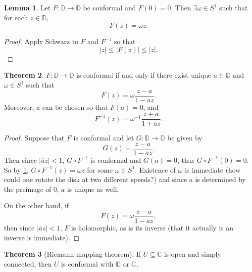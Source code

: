 \documentclass[12pt]{report}
\newcommand{\CC}{\mathbb{C}}
\newcommand{\DD}{\mathbb{D}}
\theoremstyle{definition}
\newtheorem{theorem}{Theorem}[chapter]
\newtheorem{lemma}[theorem]{Lemma}
\begin{document}
\begin{lemma}
\label{rotation of the disk}
Let $F: \DD \to \DD$ be conformal and $F(0) = 0$. Then $\exists \omega \in S^1$ such that for each $z \in \DD$,
$$F(z) = \omega z.$$
\begin{proof}
Apply Schwarz to $F$ and $F^{-1}$ so that
$$|z| \leq |F(z)| \leq |z|.$$
\end{proof}
\end{lemma}

\begin{theorem}
\label{automorphism of the disk}
$F: \DD \to \DD$ is conformal if and only if there exist unique $a \in \DD$ and $\omega \in S^1$ such that
$$F(z) = \omega \frac{z - a}{1 - \overline a z}.$$
Moreover, $a$ can be chosen so that $F(a) = 0$, and
$$F^{-1}(z) = \omega^{-1} \frac{z + a}{1 + \overline a z}.$$
\begin{proof}
Suppose that $F$ is conformal and let $G: \DD \to \DD$ be given by
$$G(z) = \frac{z - a}{1 - \overline a z}.$$
Then since $|\overline a z| < 1$, $G \circ F^{-1}$ is conformal and $G(a) = 0$, thus $G \circ F^{-1}(0) = 0$. So by \ref{rotation of the disk}, $G \circ F^{-1}(z) = \omega z$ for some $\omega \in S^1$. Existence of $\omega$ is immediate (how could one rotate the disk at two different speeds?) and since $a$ is determined by the preimage of $0$, $a$ is unique as well.

On the other hand, if
$$F(z) = \omega \frac{z - a}{1 - \overline a z},$$
then since $|\overline a z| < 1$, $F$ is holomorphic, as is its inverse (that it actually is an inverse is immediate).
\end{proof}
\end{theorem}

\begin{theorem}[Riemann mapping theorem]
If $U \subseteq \CC$ is open and simply connected, then $U$ is conformal with $\DD$ or $\CC$.
\end{theorem}
\end{document}
